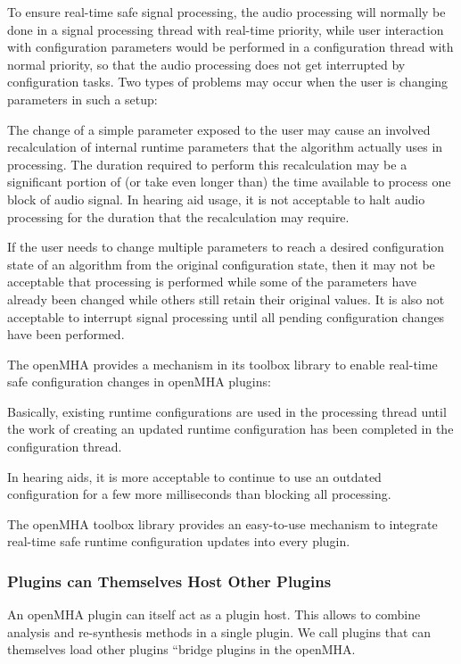 To ensure real-\/time safe signal processing, the audio processing will normally be done in a signal processing thread with real-\/time priority, while user interaction with configuration parameters would be performed in a configuration thread with normal priority, so that the audio processing does not get interrupted by configuration tasks. Two types of problems may occur when the user is changing parameters in such a setup:
\begin{DoxyItemize}
\item The change of a simple parameter exposed to the user may cause an involved recalculation of internal runtime parameters that the algorithm actually uses in processing. The duration required to perform this recalculation may be a significant portion of (or take even longer than) the time available to process one block of audio signal. In hearing aid usage, it is not acceptable to halt audio processing for the duration that the recalculation may require.
\item If the user needs to change multiple parameters to reach a desired configuration state of an algorithm from the original configuration state, then it may not be acceptable that processing is performed while some of the parameters have already been changed while others still retain their original values. It is also not acceptable to interrupt signal processing until all pending configuration changes have been performed.
\end{DoxyItemize}The openMHA provides a mechanism in its toolbox library to enable real-\/time safe configuration changes in openMHA plugins:

Basically, existing runtime configurations are used in the processing thread until the work of creating an updated runtime configuration has been completed in the configuration thread.

In hearing aids, it is more acceptable to continue to use an outdated configuration for a few more milliseconds than blocking all processing.

The openMHA toolbox library provides an easy-\/to-\/use mechanism to integrate real-\/time safe runtime configuration updates into every plugin.\subsubsection{Plugins can Themselves Host Other Plugins}\label{index_bridge}
An openMHA plugin can itself act as a plugin host. This allows to combine analysis and re-\/synthesis methods in a single plugin. We call plugins that can themselves load other plugins ``bridge plugins\textquotesingle{}\textquotesingle{} in the openMHA.

